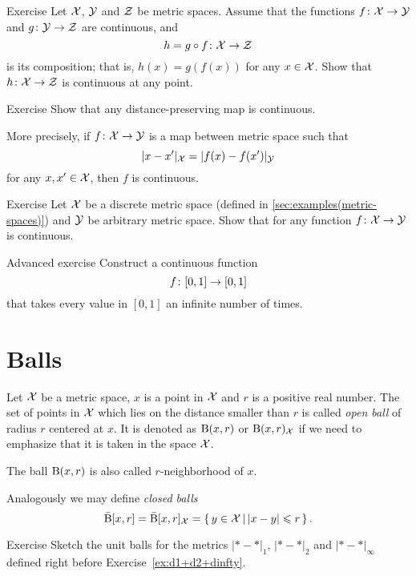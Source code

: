 \begin{thm}{Exercise}\label{ex:comp+cont}
Let $\mathcal{X}$, $\mathcal{Y}$ and $\mathcal{Z}$ be metric spaces.
Assume that the functions $f\colon\mathcal{X}\to\mathcal{Y}$
and $g\colon\mathcal{Y}\to\mathcal{Z}$ are continuous,
and 
\[h=g\circ f\colon\mathcal{X}\to \mathcal{Z}\] is its composition;
that is, $h(x)=g(f(x))$ for any $x\in \mathcal{X}$.
Show that $h\colon\mathcal{X}\to\mathcal{Z}$ is continuous at any point.
\end{thm}

\begin{thm}{Exercise}\label{ex:isom-cont}
Show that any distance-preserving map is continuous.

More precisely, if $f\colon\mathcal{X}\to\mathcal{Y}$ is a map between metric space such that
\[|x-x'|_{\mathcal X}=
|f(x)-f(x')|_{\mathcal Y}\]
for any $x,x'\in \mathcal{X}$, then 
$f$ is continuous.
\end{thm}

\begin{thm}{Exercise}\label{ex:to-descrete}
Let $\mathcal{X}$ be a discrete metric space (defined in \ref{sec:examples(metric-spaces)})
and $\mathcal{Y}$ be arbitrary metric space.
Show that for any function $f\colon\mathcal{X}\to\mathcal{Y}$ is continuous.
\end{thm}



\begin{thm}{Advanced exercise}
Construct a continuous function 
\[f\:[0,1]\z\to [0,1]\] that takes every value in $[0,1]$ 
an infinite number of times.
\end{thm}


\section{Balls}

Let $\mathcal{X}$ be a metric space, 
$x$ is a point in $\mathcal{X}$ 
and $r$ is a positive real number.
The set of points in $\mathcal{X}$ which lies on the distance smaller than $r$ is called \emph{open ball} of radius $r$ centered at $x$.
It is denoted as $\mathrm{B}(x,r)$ 
or $\mathrm{B}(x,r)_{\mathcal{X}}$ if we need to emphasize that it is taken in the space $\mathcal{X}$.

The ball $\mathrm{B}(x,r)$ is also called $r$-neighborhood of $x$.

Analogously we may define \emph{closed balls} 
\[\bar{\mathrm{B}}[x,r]=\bar{\mathrm{B}}[x,r]_{\mathcal{X}}=\left\{\,{y\in \mathcal{X}}\,\middle|\,{|x-y|\leqslant r}\,\right\}.\] 

\begin{thm}{Exercise}\label{ex:d1+d2+dinfty-balls}
Sketch the unit balls for the metrics $|{*}-{*}|_1$, $|{*}-{*}|_2$ and $|{*}-{*}|_\infty$ defined right before Exercise~\ref{ex:d1+d2+dinfty}.
\end{thm}


